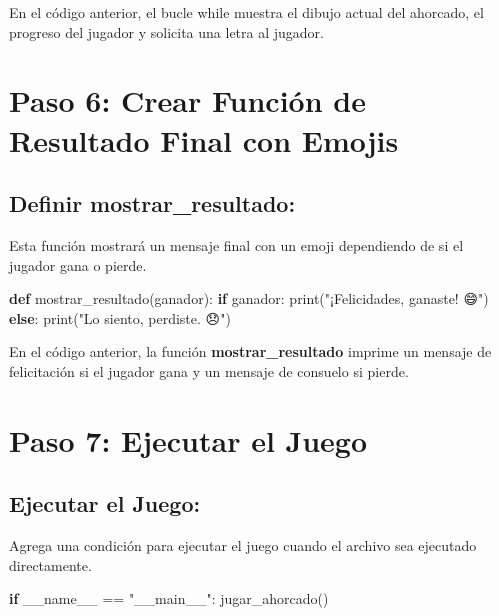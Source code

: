 \documentclass[
  a4paper,
  DIV=11,
  numbers=noendperiod,
  onepage,
  openany]{scrreprt}
\newenvironment{Shaded}{\begin{snugshade}}{\end{snugshade}}
\newcommand{\BuiltInTok}[1]{\textcolor[rgb]{0.00,0.23,0.31}{#1}}
\newcommand{\ControlFlowTok}[1]{\textcolor[rgb]{0.00,0.23,0.31}{\textbf{#1}}}
\newcommand{\KeywordTok}[1]{\textcolor[rgb]{0.00,0.23,0.31}{\textbf{#1}}}
\newcommand{\NormalTok}[1]{\textcolor[rgb]{0.00,0.23,0.31}{#1}}
\newcommand{\OperatorTok}[1]{\textcolor[rgb]{0.37,0.37,0.37}{#1}}
\newcommand{\StringTok}[1]{\textcolor[rgb]{0.13,0.47,0.30}{#1}}
\newcommand{\VariableTok}[1]{\textcolor[rgb]{0.07,0.07,0.07}{#1}}
\begin{document}
En el código anterior, el bucle while muestra el dibujo actual del
ahorcado, el progreso del jugador y solicita una letra al jugador.

\section{Paso 6: Crear Función de Resultado Final con
Emojis}\label{paso-6-crear-funciuxf3n-de-resultado-final-con-emojis}

\subsection{Definir
mostrar\_resultado:}\label{definir-mostrar_resultado}

Esta función mostrará un mensaje final con un emoji dependiendo de si el
jugador gana o pierde.

\begin{Shaded}
\begin{Highlighting}[]
\KeywordTok{def}\NormalTok{ mostrar\_resultado(ganador):}
    \ControlFlowTok{if}\NormalTok{ ganador:}
        \BuiltInTok{print}\NormalTok{(}\StringTok{"¡Felicidades, ganaste! 😄"}\NormalTok{)}
    \ControlFlowTok{else}\NormalTok{:}
        \BuiltInTok{print}\NormalTok{(}\StringTok{"Lo siento, perdiste. 😞"}\NormalTok{)}
\end{Highlighting}
\end{Shaded}

En el código anterior, la función \textbf{mostrar\_resultado} imprime un
mensaje de felicitación si el jugador gana y un mensaje de consuelo si
pierde.

\section{Paso 7: Ejecutar el Juego}\label{paso-7-ejecutar-el-juego}

\subsection{Ejecutar el Juego:}\label{ejecutar-el-juego}

Agrega una condición para ejecutar el juego cuando el archivo sea
ejecutado directamente.

\begin{Shaded}
\begin{Highlighting}[]
\ControlFlowTok{if} \VariableTok{\_\_name\_\_} \OperatorTok{==} \StringTok{"\_\_main\_\_"}\NormalTok{:}
\NormalTok{    jugar\_ahorcado()}
\end{Highlighting}
\end{Shaded}
\end{document}
